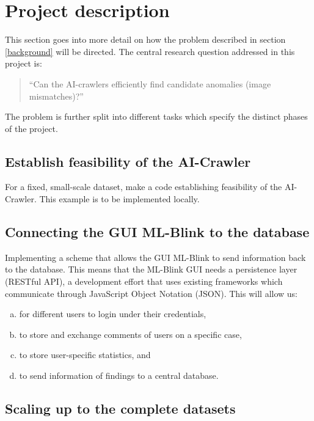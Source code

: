 \section{Project description} \label{description}

This section goes into more detail on how the problem described in section \ref{background} will be directed. The central research question addressed in this project is:

\begin{quote}
  ``Can the AI-crawlers efficiently find candidate anomalies (image mismatches)?''
\end{quote}

The problem is further split into different tasks which specify the distinct phases of the project.

\subsection{Establish feasibility of the AI-Crawler}

For a fixed, small-scale dataset, make a code establishing feasibility of the AI-Crawler. This example is to be implemented locally.

\subsection{Connecting the GUI ML-Blink to the database}

Implementing a scheme that allows the GUI ML-Blink to send information back to the database. This means that the ML-Blink GUI needs a persistence layer (RESTful API), a development effort that uses existing frameworks which communicate through JavaScript Object Notation (JSON).  This will allow us:

\begin{enumerate}[(a)]
  \item for different users to login under their credentials,
  \item to store and exchange comments of users on a specific case,
  \item to store user-specific statistics, and
  \item to send information of findings to a central database.
\end{enumerate}

\subsection{Scaling up to the complete datasets}

